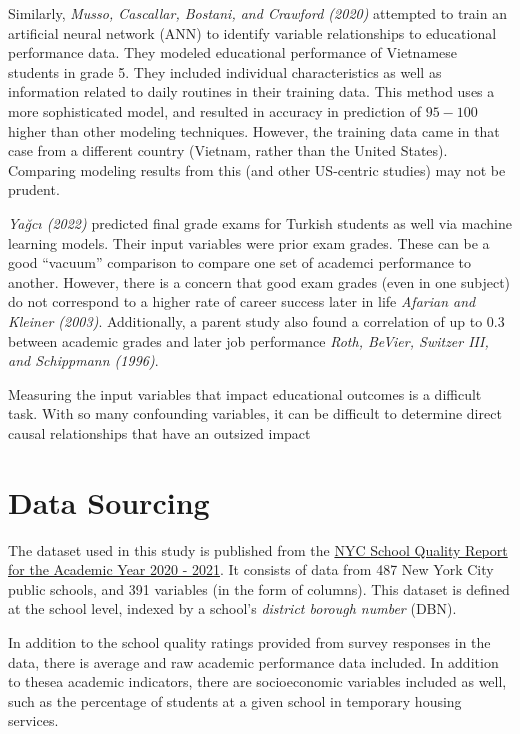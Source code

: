 \documentclass[
  man]{apa6}
\begin{document}
Similarly, \emph{Musso, Cascallar, Bostani, and Crawford (2020)} attempted to train an artificial neural network (ANN) to identify variable relationships to educational performance data. They modeled educational performance of Vietnamese students in grade 5. They included individual characteristics as well as information related to daily routines in their training data. This method uses a more sophisticated model, and resulted in accuracy in prediction of \(95-100%
\) higher than other modeling techniques. However, the training data came in that case from a different country (Vietnam, rather than the United States). Comparing modeling results from this (and other US-centric studies) may not be prudent.

\emph{Yağcı (2022)} predicted final grade exams for Turkish students as well via machine learning models. Their input variables were prior exam grades. These can be a good ``vacuum'' comparison to compare one set of academci performance to another. However, there is a concern that good exam grades (even in one subject) do not correspond to a higher rate of career success later in life \emph{Afarian and Kleiner (2003)}. Additionally, a parent study also found a correlation of up to 0.3 between academic grades and later job performance \emph{Roth, BeVier, Switzer III, and Schippmann (1996)}.

Measuring the input variables that impact educational outcomes is a difficult task. With so many confounding variables, it can be difficult to determine direct causal relationships that have an outsized impact

\hypertarget{data-sourcing}{%
\section{Data Sourcing}\label{data-sourcing}}

The dataset used in this study is published from the \href{https://data.cityofnewyork.us/Education/2020-2021-School-Quality-Reports-High-School/26je-vkp6}{NYC School Quality Report for the Academic Year 2020 - 2021}. It consists of data from 487 New York City public schools, and 391 variables (in the form of columns). This dataset is defined at the school level, indexed by a school's \emph{district borough number} (DBN).

In addition to the school quality ratings provided from survey responses in the data, there is average and raw academic performance data included. In addition to thesea academic indicators, there are socioeconomic variables included as well, such as the percentage of students at a given school in temporary housing services.
\end{document}
